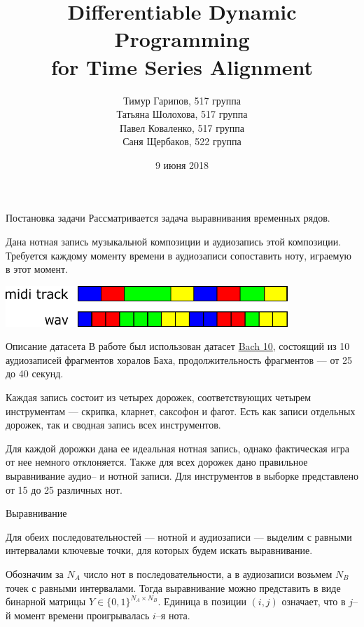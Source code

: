 \documentclass[unicode, dvipsnames]{beamer}
\title[Time Series Alignment]{Differentiable Dynamic Programming \\ for Time Series Alignment}
\author[Гарипов и прочие]{Тимур Гарипов, 517 группа \\ Татьяна Шолохова, 517 группа \\ Павел Коваленко, 517 группа \\ Саня Щербаков, 522 группа}
\date{9 июня 2018}
\begin{document}
\begin{frame}
    \titlepage
\end{frame}

\begin{frame}{Постановка задачи}
	Рассматривается задача выравнивания временных рядов.
	
	\bigskip
	Дана нотная запись музыкальной композиции и аудиозапись этой композиции. Требуется каждому моменту времени в аудиозаписи сопоставить ноту, играемую в этот момент.
	
	\bigskip
	\centering
	\includegraphics[width=0.8\textwidth]{graphics/task.pdf}
\end{frame}

\begin{frame}{Описание датасета}
В работе был использован датасет \href{http://music.cs.northwestern.edu/data/Bach10.html}{Bach 10}, состоящий из 10 аудиозаписей фрагментов хоралов Баха, продолжительность фрагментов --- от 25 до 40 секунд. 

\bigskip
Каждая запись состоит из четырех дорожек, соответствующих четырем инструментам --- скрипка, кларнет, саксофон и фагот. Есть как записи отдельных дорожек, так и сводная запись всех инструментов.

\bigskip
Для каждой дорожки дана ее идеальная нотная запись, однако фактическая игра от нее немного отклоняется. Также для всех дорожек дано правильное выравнивание аудио-- и нотной записи. Для инструментов в выборке представлено от 15 до 25 различных нот.

\end{frame}

\begin{frame}{Выравнивание}

Для обеих последовательностей --- нотной и аудиозаписи --- выделим с равными интервалами ключевые точки, для которых будем искать выравнивание.

\bigskip
Обозначим за $N_A$ число нот в последовательности, а в аудиозаписи возьмем $N_B$ точек с равными интервалами. Тогда выравнивание можно представить в виде бинарной матрицы $Y \in \{0, 1\}^{N_A \times N_B}$. Единица в позиции $(i, j)$ означает, что в $j$--й момент времени проигрывалась $i$--я нота.

\end{frame}
\end{document}
